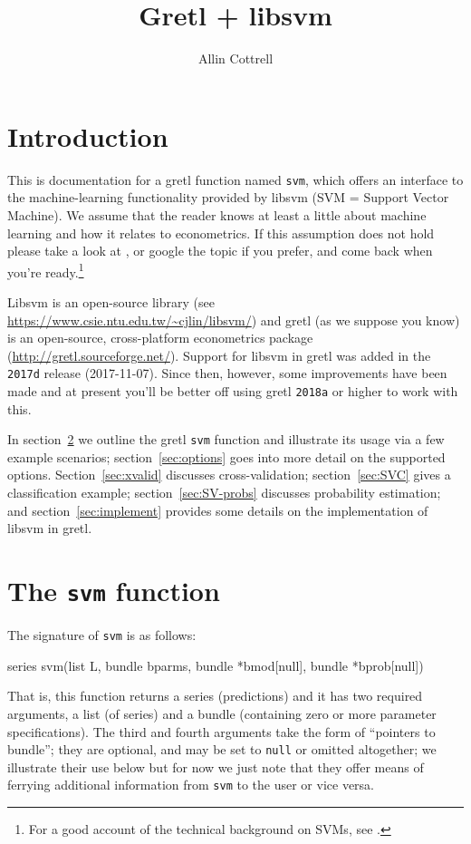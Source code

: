\documentclass{article}
\begin{document}
\setlength{\parindent}{0pt}
\setlength{\parskip}{1ex}
\setcounter{secnumdepth}{2}

\title{Gretl + libsvm}
\author{Allin Cottrell}
\maketitle

\section{Introduction}
\label{sec:intro}

This is documentation for a gretl function named \texttt{svm}, which
offers an interface to the machine-learning functionality provided by
\textsf{libsvm} (SVM = Support Vector Machine). We assume that the
reader knows at least a little about machine learning and how it
relates to econometrics. If this assumption does not hold please take
a look at \cite{mull-spiess17}, or google the topic if you prefer, and
come back when you're ready.\footnote{For a good account of the
  technical background on SVMs, see \cite{smola04}.}

\textsf{Libsvm} is an open-source library (see
\url{https://www.csie.ntu.edu.tw/~cjlin/libsvm/}) and gretl (as we
suppose you know) is an open-source, cross-platform econometrics
package (\url{http://gretl.sourceforge.net/}). Support for
\textsf{libsvm} in gretl was added in the \texttt{2017d} release
(2017-11-07). Since then, however, some improvements have been made
and at present you'll be better off using gretl \texttt{2018a} or
higher to work with this.

In section~\ref{sec:function} we outline the gretl \texttt{svm}
function and illustrate its usage via a few example scenarios;
section~\ref{sec:options} goes into more detail on the supported
options. Section~\ref{sec:xvalid} discusses cross-validation;
section~\ref{sec:SVC} gives a classification example;
section~\ref{sec:SV-probs} discusses probability estimation; and
section~\ref{sec:implement} provides some details on the
implementation of \textsf{libsvm} in gretl.

\section{The \texttt{svm} function}
\label{sec:function}

The signature of \texttt{svm} is as follows:
\begin{code}
series svm(list L, bundle bparms, bundle *bmod[null], bundle *bprob[null])
\end{code}
That is, this function returns a series (predictions) and it has two
required arguments, a list (of series) and a bundle (containing zero
or more parameter specifications). The third and fourth arguments take
the form of ``pointers to bundle''; they are optional, and may be set
to \texttt{null} or omitted altogether; we illustrate their use below
but for now we just note that they offer means of ferrying additional
information from \texttt{svm} to the user or vice versa.
\end{document}
